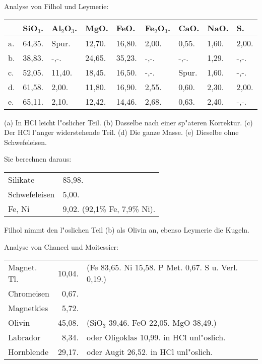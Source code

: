 \documentclass[a4paper, 11pt, oneside]{article}
\begin{document}
Analyse von Filhol und Leymerie:
\begin{table}[H]
    \centering
    \begin{tabular}{l l l l l l l l l}
         & SiO$_{3}$. & Al$_{2}$O$_{3}$. & MgO. & FeO. & Fe$_{2}$O$_{3}$. & CaO. & NaO. & S. \\ \hline
        a. & 64,35. & Spur. & 12,70. & 16,80. & 2,00. & 0,55. & 1,60. & 2,00. \\
        b. & 38,83. & -,-. & 24,65. & 35,23. & -,-. & -,-. & 1,29. & -,-. \\
        c. & 52,05. & 11,40. & 18,45. & 16,50. & -,-. & Spur. & 1,60. & -,-. \\
        d. & 61,58. & 2,00. & 11,80. & 16,90. & 2,55. & 0,60. & 2,30. & 2,00. \\
        e. & 65,11. & 2,10. & 12,42. & 14,46. & 2,68. & 0,63. & 2,40. & -,-. \\
    \end{tabular}
\end{table}

(a) In HCl leicht l"oslicher Teil. (b) Dasselbe nach einer sp"ateren Korrektur. (c) Der HCl l"anger widerstehende Teil. (d) Die ganze Masse. (e) Dieselbe ohne Schwefeleisen.

Sie berechnen daraus:
\begin{table}[H]
    \centering
    \begin{tabular}{l l}
        Silikate & 85,98. \\
        Schwefeleisen & 5,00. \\
        Fe, Ni & 9,02. (92,1\% Fe, 7,9\% Ni). \\
    \end{tabular}
\end{table}

Filhol nimmt den l"oslichen Teil (b) als Olivin an, ebenso Leymerie die Kugeln.

Analyse von Chancel und Moitessier:
\begin{table}[H]
    \centering
    \begin{tabular}{l r l}
        Magnet. Tl. & 10,04. & (Fe 83,65. Ni 15,58. P Met. 0,67. S u. Verl. 0,19.) \\
        Chromeisen & 0,67. & \\
        Magnetkies & 5,72. & \\
        Olivin & 45,08. & (SiO$_{3}$ 39,46. FeO 22,05. MgO 38,49.) \\
        Labrador & 8,34. & oder Oligoklas 10,99. in HCl unl"oslich. \\
        Hornblende & 29,17. & oder Augit 26,52. in HCl unl"oslich. \\
    \end{tabular}
\end{table}
\end{document}

